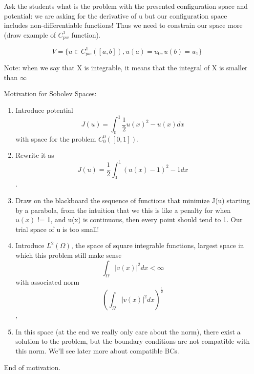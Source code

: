 \begin{enumerate}
Ask the students what is the problem with the presented configuration space and potential: we are asking for the derivative of u but our configuration space includes non-differentiable functions!
Thus we need to constrain our space more (draw example of $C^1_{pw}$ function).

\begin{equation}
    V = \{u \in C^1_{pw}([a,b]), u(a) = u_0, u(b) = u_1\}
\end{equation}
\end{enumerate}

Note: when we say that X is integrable, it means that the integral of X is smaller than $\infty$

Motivation for Sobolev Spaces:
\begin{enumerate}
    \item Introduce potential$$J(u) = \int_0^1 \frac{1}{2}u(x)^2 - u(x) dx$$ with space for the problem $C^0_0([0,1])$.
    \item Rewrite it as $$J(u) = \frac{1}{2}\int_0^1 (u(x) - 1)^2 - 1 dx$$.
    \item Draw on the blackboard the sequence of functions that minimize J(u) starting by a parabola, from the intuition that we this is like a penalty for when $u(x)$ != 1, and u(x) is continuous, then every point should tend to 1. Our trial space of u is too small!
    \item Introduce $L^2(\Omega)$, the space of square integrable functions, largest space in which this problem still make sense
    $$\int_\Omega |v(x)|^2 dx < \infty $$ with associated norm
    $$(\int_\Omega |v(x)|^2 dx)^\frac{1}{2} $$,
    \item In this space (at the end we really only care about the norm), there exist a solution to the problem, but the boundary conditions are not compatible with this norm. We'll see later more about compatible BCs.
\end{enumerate}
End of motivation.


